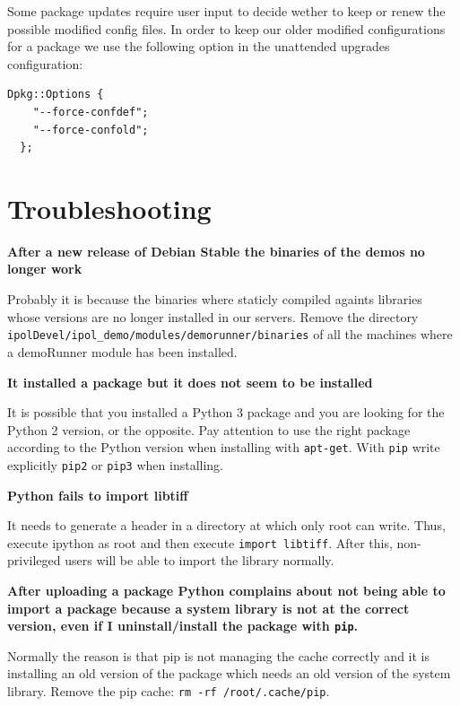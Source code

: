 \documentclass[a4paper,12pt]{article}
\begin{document}
Some package updates require user input to decide wether to keep or renew the possible modified config files. In order to keep our older modified configurations for a package we use the following option in the unattended upgrades configuration:

\begin{lstlisting}[firstnumber=1,breaklines]
  Dpkg::Options {
    "--force-confdef";
    "--force-confold";
  };
\end{lstlisting}


\section{Troubleshooting}

\textbf{After a new release of Debian Stable the binaries of the demos no longer work}

Probably it is because the binaries where staticly compiled againts libraries whose versions are no longer installed in our servers. Remove the directory {\tt ipolDevel/ipol\_demo/modules/demorunner/binaries} of all the machines where a demoRunner module has been installed.
\vspace{0.5cm}

\textbf{It installed a package but it does not seem to be installed}

It is possible that you installed a Python 3 package and you are looking for the Python 2 version, or the opposite. Pay attention to use the right package according to the Python version when installing with {\tt apt-get}. With {\tt pip} write explicitly {\tt pip2} or {\tt pip3} when installing.
\vspace{0.5cm}


\textbf{Python fails to import libtiff}

It needs to generate a header in a directory at which only root can write. Thus, execute ipython as root and then execute {\tt import libtiff}. After this, non-privileged users will be able to import the library normally.
\vspace{0.5cm}

\textbf{After uploading a package Python complains about not being able to import a package because a system library is not at the correct version, even if I uninstall/install the package with {\tt pip}.}

Normally the reason is that pip is not managing the cache correctly and it is installing an old version of the package which needs an old version of the system library. Remove the pip cache: {\tt rm -rf /root/.cache/pip}.
\vspace{0.5cm}
\end{document}
